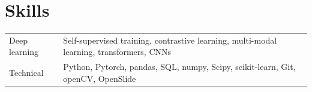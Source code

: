 \documentclass[a4paper,12pt]{article}
\begin{document}

\enlargethispage{3\baselineskip}

\section{Skills}
\begin{tabularx}{\linewidth}{@{}l X@{}}
Deep learning & \normalsize{Self-supervised training, contrastive learning, multi-modal learning, transformers, CNNs}\\
Technical &  \normalsize{Python, Pytorch, pandas, SQL, numpy, Scipy, scikit-learn, Git, openCV, OpenSlide} 
\end{tabularx}


{}
\end{document}
